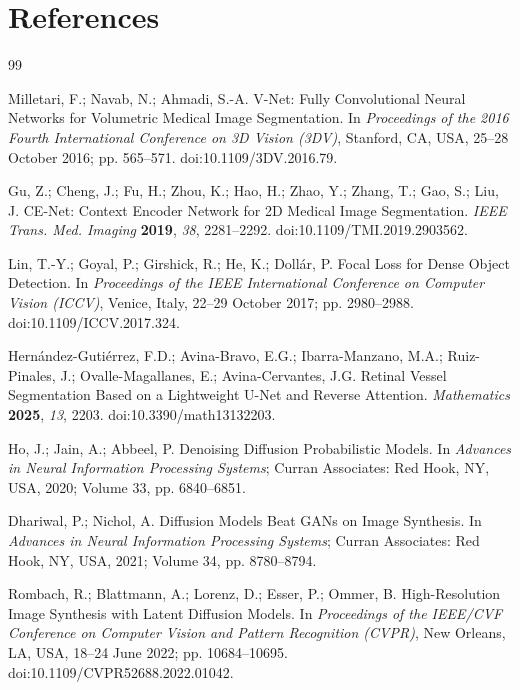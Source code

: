 \documentclass[jimaging,article,submit,pdftex,moreauthors]
  {Definitions/mdpi}
\newif\ifmdpiclass\mdpiclasstrue
\newif\ifmdpiclass\mdpiclassfalse
\providecommand{\href}[2]{#2}
\begin{document}
\ifmdpiclass
  \reftitle{References}
\else
  \section*{References}
\fi
\begin{thebibliography}{99}

Milletari, F.; Navab, N.; Ahmadi, S.-A. V-Net: Fully Convolutional Neural Networks for Volumetric Medical Image Segmentation. In \textit{Proceedings of the 2016 Fourth International Conference on 3D Vision (3DV)}, Stanford, CA, USA, 25--28 October 2016; pp. 565--571. \href{https://doi.org/10.1109/3DV.2016.79}{doi:10.1109/3DV.2016.79}.

Gu, Z.; Cheng, J.; Fu, H.; Zhou, K.; Hao, H.; Zhao, Y.; Zhang, T.; Gao, S.; Liu, J. CE-Net: Context Encoder Network for 2D Medical Image Segmentation. \textit{IEEE Trans. Med. Imaging} \textbf{2019}, \textit{38}, 2281--2292. \href{https://doi.org/10.1109/TMI.2019.2903562}{doi:10.1109/TMI.2019.2903562}.

Lin, T.-Y.; Goyal, P.; Girshick, R.; He, K.; Doll\'ar, P. Focal Loss for Dense Object Detection. In \textit{Proceedings of the IEEE International Conference on Computer Vision (ICCV)}, Venice, Italy, 22--29 October 2017; pp. 2980--2988. \href{https://doi.org/10.1109/ICCV.2017.324}{doi:10.1109/ICCV.2017.324}.

Hern\'andez-Guti\'errez, F.D.; Avina-Bravo, E.G.; Ibarra-Manzano, M.A.; Ruiz-Pinales, J.; Ovalle-Magallanes, E.; Avina-Cervantes, J.G. Retinal Vessel Segmentation Based on a Lightweight U-Net and Reverse Attention. \textit{Mathematics} \textbf{2025}, \textit{13}, 2203. \href{https://doi.org/10.3390/math13132203}{doi:10.3390/math13132203}.

Ho, J.; Jain, A.; Abbeel, P. Denoising Diffusion Probabilistic Models. In \textit{Advances in Neural Information Processing Systems}; Curran Associates: Red Hook, NY, USA, 2020; Volume 33, pp. 6840--6851.

Dhariwal, P.; Nichol, A. Diffusion Models Beat GANs on Image Synthesis. In \textit{Advances in Neural Information Processing Systems}; Curran Associates: Red Hook, NY, USA, 2021; Volume 34, pp. 8780--8794.

Rombach, R.; Blattmann, A.; Lorenz, D.; Esser, P.; Ommer, B. High-Resolution Image Synthesis with Latent Diffusion Models. In \textit{Proceedings of the IEEE/CVF Conference on Computer Vision and Pattern Recognition (CVPR)}, New Orleans, LA, USA, 18--24 June 2022; pp. 10684--10695. \href{https://doi.org/10.1109/CVPR52688.2022.01042}{doi:10.1109/CVPR52688.2022.01042}.


\end{thebibliography}
\end{document}

